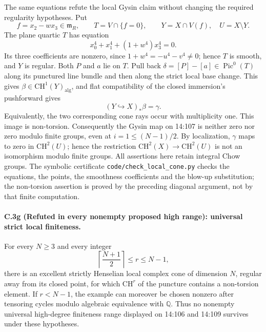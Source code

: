The same equations refute the local Gysin claim without changing
the required regularity hypotheses. Put
\[
 f=x_2-wx_3\in\mathfrak m_R,\qquad
 T=V\cap\{f=0\},\qquad Y=X\cap V(f),\quad U=X\setminus Y.
\]
The plane quartic $T$ has equation
\[
                    x_0^4+x_1^4+(1+w^4)x_3^4=0.
\]
Its three coefficients are nonzero, since
$1+w^4=-u^4-v^4\ne0$; hence $T$ is smooth, and $Y$ is regular.
Both $P$ and $a$ lie on $T$. Pull back
$\delta=[P]-[a]\in\operatorname{Pic}^0(T)$ along its punctured
line bundle and then along the strict local base change. This gives
$\beta\in\mathrm{CH}^1(Y)_{\mathrm{alg}}$, and flat compatibility
of the closed immersion's pushforward gives
\[
                        (Y\hookrightarrow X)_*\beta=\gamma.
\]
Equivalently, the two corresponding cone rays occur with
multiplicity one. This image is non-torsion. Consequently the Gysin
map on 14:107 is neither zero nor zero modulo finite groups, even
at $i=1\le(N-1)/2$. By localization, $\gamma$ maps to zero in
$\mathrm{CH}^2(U)$; hence the restriction
$\mathrm{CH}^2(X)\to\mathrm{CH}^2(U)$ is not an isomorphism modulo
finite groups. All assertions here retain integral Chow groups.
The symbolic certificate \texttt{code/check\_local\_cone.py}
checks the equations, the points, the smoothness coefficients and
the blow-up substitution; the non-torsion assertion is proved by
the preceding diagonal argument, not by that finite computation.

\paragraph{C.3g (Refuted in every nonempty proposed high range):
universal strict local finiteness.}
For every $N\ge3$ and every integer
\[
                  \left\lceil\frac{N+1}{2}\right\rceil
                              \le r\le N-1,
\]
there is an excellent strictly Henselian local complex cone of
dimension $N$, regular away from its closed point, for which
$\mathrm{CH}^r$ of the puncture contains a non-torsion element.
If $r<N-1$, the example can moreover be chosen nonzero after
tensoring cycles modulo algebraic equivalence with $\mathbb Q$.
Thus no nonempty universal high-degree finiteness range displayed
on 14:106 and 14:109 survives under these hypotheses.


